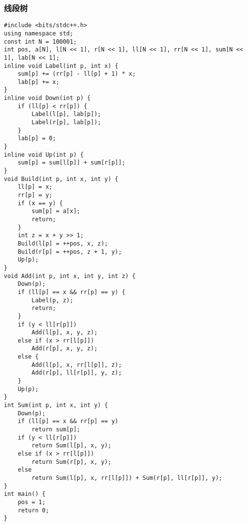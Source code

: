 \documentclass[a4paper]{article}
\begin{document}
\subsubsection{线段树}
\begin{lstlisting}
#include <bits/stdc++.h>
using namespace std;
const int N = 100001;
int pos, a[N], l[N << 1], r[N << 1], ll[N << 1], rr[N << 1], sum[N << 1], lab[N << 1];
inline void Label(int p, int x) {
    sum[p] += (rr[p] - ll[p] + 1) * x;
    lab[p] += x;
}
inline void Down(int p) {
    if (ll[p] < rr[p]) {
        Label(l[p], lab[p]);
        Label(r[p], lab[p]);
    }
    lab[p] = 0;
}
inline void Up(int p) {
    sum[p] = sum[l[p]] + sum[r[p]];
}
void Build(int p, int x, int y) {
    ll[p] = x;
    rr[p] = y;
    if (x == y) {
        sum[p] = a[x];
        return;
    }
    int z = x + y >> 1;
    Build(l[p] = ++pos, x, z);
    Build(r[p] = ++pos, z + 1, y);
    Up(p);
}
void Add(int p, int x, int y, int z) {
    Down(p);
    if (ll[p] == x && rr[p] == y) {
        Label(p, z);
        return;
    }
    if (y < ll[r[p]])
        Add(l[p], x, y, z);
    else if (x > rr[l[p]])
        Add(r[p], x, y, z);
    else {
        Add(l[p], x, rr[l[p]], z);
        Add(r[p], ll[r[p]], y, z);
    }
    Up(p);
}
int Sum(int p, int x, int y) {
    Down(p);
    if (ll[p] == x && rr[p] == y)
        return sum[p];
    if (y < ll[r[p]])
        return Sum(l[p], x, y);
    else if (x > rr[l[p]])
        return Sum(r[p], x, y);
    else
        return Sum(l[p], x, rr[l[p]]) + Sum(r[p], ll[r[p]], y);
}
int main() {
    pos = 1;
    return 0;
}
\end{lstlisting}
\end{document}
